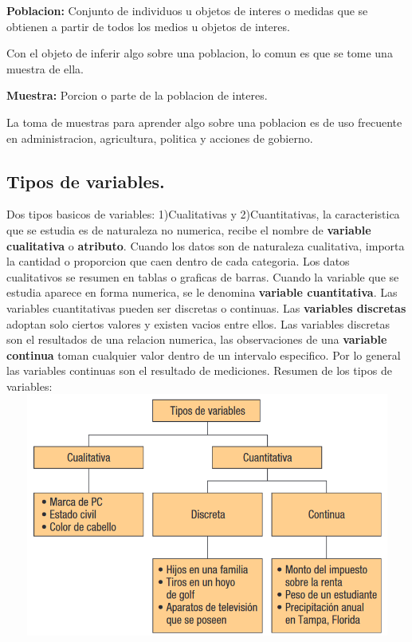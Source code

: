 \documentclass[]{article}
\begin{document}
\begin{flushleft}
	\textbf{Poblacion: }Conjunto de individuos u objetos de interes o medidas que se obtienen a partir de todos los medios u objetos de interes.
\end{flushleft}
Con el objeto de inferir algo sobre una poblacion, lo comun es que se tome una muestra de ella.
\begin{flushleft}
	\textbf{Muestra: }Porcion o parte de la poblacion de interes.
\end{flushleft}
La toma de muestras para aprender algo sobre una poblacion es de uso frecuente en administracion, agricultura, politica y acciones de gobierno.

\subsection{Tipos de variables.}
Dos tipos basicos de variables: 1)Cualitativas y 2)Cuantitativas, la caracteristica que se estudia es de naturaleza no numerica, recibe el nombre de \textbf{variable cualitativa} o \textbf{atributo}. Cuando los datos son de naturaleza cualitativa, importa la cantidad o proporcion que caen dentro de cada categoria. Los datos cualitativos se resumen en tablas o graficas de barras. Cuando la variable que se estudia aparece en forma numerica, se le denomina \textbf{variable cuantitativa}. Las variables cuantitativas pueden ser discretas o continuas. Las \textbf{variables discretas} adoptan solo ciertos valores y existen vacios entre ellos. Las variables discretas son el resultados de una relacion numerica, las observaciones de una \textbf{variable continua} toman cualquier valor dentro de un intervalo especifico. Por lo general las variables continuas son el resultado de mediciones. \linebreak Resumen de los tipos de variables: \\
\includegraphics[width=14cm, height=8cm]{resumenTiposVariables1_2}
\end{document}
